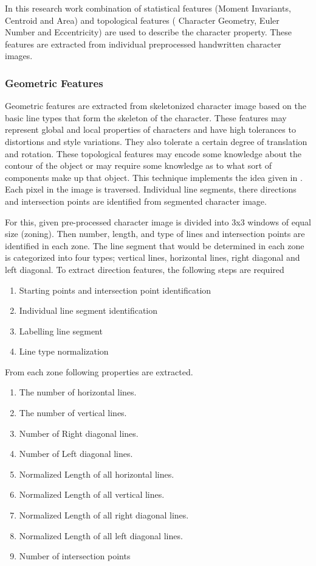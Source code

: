 \documentclass[12pt,a4paper,oneside]{article}
\numberwithin{equation}{section}
\numberwithin{algorithm}{section}
\begin{document}
In this research work combination of statistical features (Moment Invariants, Centroid and Area) and topological features ( Character Geometry, Euler Number and Eccentricity) are used to describe the character property. These features are extracted from individual preprocessed handwritten character images.

\subsubsection{Geometric Features}
\label{geometric_features}
Geometric features are extracted from skeletonized character image based on the basic line types that form the skeleton of the character. These features may represent global and local properties of characters and have high tolerances to distortions and style variations.  They also tolerate a certain degree of translation and rotation.  These topological features may encode some knowledge about the contour of the object or may require some knowledge as to what sort of components make up that object.
This technique implements the idea given in \cite{Blumenstein2003}. Each pixel in the image is traversed. Individual line segments, there directions and intersection points are identified from segmented character image.

For this, given pre-processed character image is divided into 3x3 windows of equal size (zoning). Then number, length, and type of lines and intersection points are identified in each zone. The line segment that would be determined in each zone is categorized into four types; vertical lines, horizontal lines, right diagonal and left diagonal.
To extract direction features, the following steps are required

\begin{enumerate}
\item Starting points and intersection point identification
\item Individual line segment identification
\item Labelling line segment
\item Line type normalization
\end{enumerate}


From each zone following properties are extracted.
\begin{enumerate}
\item The number of horizontal lines.
\item The number of vertical lines.
\item Number of Right diagonal lines.
\item Number of Left diagonal lines.
\item Normalized Length of all horizontal lines.
\item Normalized Length of all vertical lines.
\item Normalized Length of all right diagonal lines.
\item Normalized Length of all left diagonal lines.
\item Number of intersection points
\end{enumerate}
\end{document}
